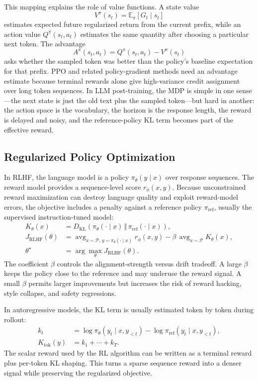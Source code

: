 This mapping explains the role of value functions. A state value
\[
    V^\pi(s_t)=\mathbb{E}_\pi\left[G_t \mid s_t\right]
\]
estimates expected future regularized return from the current prefix, while an action value $Q^\pi(s_t,a_t)$ estimates the same quantity after choosing a particular next token. The advantage
\[
    A^\pi(s_t,a_t)=Q^\pi(s_t,a_t)-V^\pi(s_t)
\]
asks whether the sampled token was better than the policy's baseline expectation for that prefix. PPO and related policy-gradient methods need an advantage estimate because terminal rewards alone give high-variance credit assignment over long token sequences. In LLM post-training, the MDP is simple in one sense---the next state is just the old text plus the sampled token---but hard in another: the action space is the vocabulary, the horizon is the response length, the reward is delayed and noisy, and the reference-policy KL term becomes part of the effective reward.

\subsection{Regularized Policy Optimization}
In RLHF, the language model is a policy $\pi_\theta(y\mid x)$ over response sequences. The reward model provides a sequence-level score $r_\phi(x,y)$. Because unconstrained reward maximization can destroy language quality and exploit reward-model errors, the objective includes a penalty against a reference policy $\pi_{\mathrm{ref}}$, usually the supervised instruction-tuned model:
\[
    \begin{aligned}
    K_\theta(x)
      &= D_{\mathrm{KL}}(\pi_\theta(\cdot\mid x)\,\Vert\,\pi_{\mathrm{ref}}(\cdot\mid x)),\\
    J_{\mathrm{RLHF}}(\theta)
      &= \operatorname{avg}_{x\sim\mathcal{P},\,y\sim\pi_\theta(\cdot\mid x)} r_\phi(x,y)
         -\beta\,\operatorname{avg}_{x\sim\mathcal{P}} K_\theta(x),\\
    \theta^\star
      &= \arg\max_\theta J_{\mathrm{RLHF}}(\theta).
    \end{aligned}
\]
The coefficient $\beta$ controls the alignment-strength versus drift tradeoff. A large $\beta$ keeps the policy close to the reference and may underuse the reward signal. A small $\beta$ permits larger improvements but increases the risk of reward hacking, style collapse, and safety regressions.

In autoregressive models, the KL term is usually estimated token by token during rollout:
\[
    \begin{aligned}
    k_t
      &= \log \pi_\theta(y_t\mid x,y_{<t})
         - \log \pi_{\mathrm{ref}}(y_t\mid x,y_{<t}),\\
    K_{\mathrm{tok}}(y)
      &= k_1+\cdots+k_T.
    \end{aligned}
\]
The scalar reward used by the RL algorithm can be written as a terminal reward plus per-token KL shaping. This turns a sparse sequence reward into a denser signal while preserving the regularized objective.

